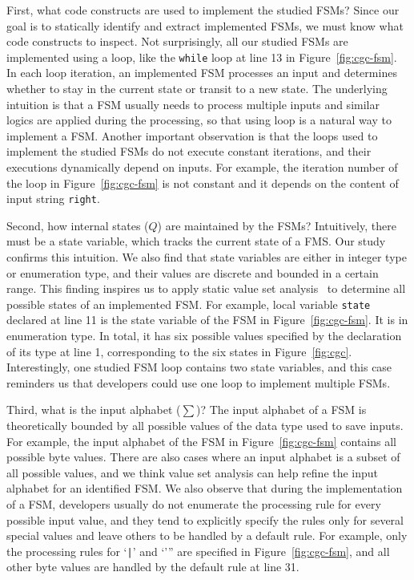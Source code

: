 First, what code constructs are used to implement the studied FSMs?
Since our goal is to statically identify and extract implemented FSMs, 
we must know what code constructs to inspect. 
Not surprisingly, all our studied FSMs are implemented using a loop, 
like the \texttt{while} loop at line 13 in Figure~\ref{fig:cgc-fsm}.  
In each loop iteration, an implemented FSM processes an input and 
determines whether to stay in the current state or transit to a new state. 
The underlying intuition is that a FSM usually needs to process 
multiple inputs and similar logics are applied during the processing, 
so that using loop is a natural way to implement a FSM. 
Another important observation is that 
the loops used to implement the studied FSMs do not execute constant iterations,
and their executions dynamically depend on inputs. 
For example, the iteration number of the loop in Figure~\ref{fig:cgc-fsm}
is not constant and it 
depends on the content of input string \texttt{right}.


Second, how internal states ($Q$) are maintained by the FSMs?
Intuitively, there must be a state variable, which tracks the current state of a FMS. 
Our study confirms this intuition. 
We also find that state variables are either in integer type or enumeration type,
and their values are discrete and bounded in a certain range. 
This finding inspires us to apply static value set analysis~\cite{DEEPVSA,VSA} 
to determine all possible states of an implemented FSM.
For example, local variable \texttt{state} declared at line 11
is the state variable of the FSM in Figure~\ref{fig:cgc-fsm}.
It is in enumeration type.
In total, it has six possible values specified by the declaration of 
its type at line 1, corresponding to 
the six states in Figure~\ref{fig:cgc}.
Interestingly, one studied FSM loop contains two state variables,
and this case reminders us that developers could use one loop 
to implement multiple FSMs. 


Third, what is the input alphabet ($\sum$)? 
The input alphabet of a FSM is theoretically bounded by all possible values 
of the data type used to save inputs. 
For example, the input alphabet of the FSM 
in Figure~\ref{fig:cgc-fsm} 
contains all possible byte values.
There are also cases where an input alphabet is a subset of all possible values, 
and we think value set analysis can help refine 
the input alphabet for an identified FSM.
We also observe that during the implementation of a FSM, 
developers usually do not enumerate the processing rule for every possible
input value, 
and they tend to explicitly specify the rules only for several special values
and leave others to be handled by a default rule. 
For example, only the processing rules for `\verb/|/' and `''' 
are specified in Figure~\ref{fig:cgc-fsm}, 
and all other byte values are handled by 
the default rule at line 31. 

